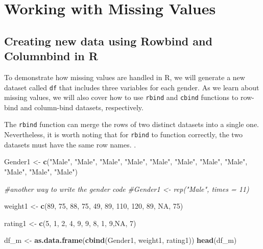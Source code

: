 \documentclass[
]{article}
\newenvironment{Shaded}{\begin{snugshade}}{\end{snugshade}}
\newcommand{\CommentTok}[1]{\textcolor[rgb]{0.56,0.35,0.01}{\textit{#1}}}
\newcommand{\ConstantTok}[1]{\textcolor[rgb]{0.56,0.35,0.01}{#1}}
\newcommand{\DecValTok}[1]{\textcolor[rgb]{0.00,0.00,0.81}{#1}}
\newcommand{\FunctionTok}[1]{\textcolor[rgb]{0.13,0.29,0.53}{\textbf{#1}}}
\newcommand{\NormalTok}[1]{#1}
\newcommand{\OtherTok}[1]{\textcolor[rgb]{0.56,0.35,0.01}{#1}}
\newcommand{\StringTok}[1]{\textcolor[rgb]{0.31,0.60,0.02}{#1}}
\begin{document}
\hypertarget{working-with-missing-values}{%
\section{Working with Missing
Values}\label{working-with-missing-values}}

\hypertarget{creating-new-data-using-rowbind-and-columnbind-in-r}{%
\subsection{Creating new data using Rowbind and Columnbind in
R}\label{creating-new-data-using-rowbind-and-columnbind-in-r}}

To demonstrate how missing values are handled in R, we will generate a
new dataset called \texttt{df} that includes three variables for each
gender. As we learn about missing values, we will also cover how to use
\texttt{rbind} and \texttt{cbind} functions to row-bind and column-bind
datasets, respectively.

The \texttt{rbind} function can merge the rows of two distinct datasets
into a single one. Nevertheless, it is worth noting that for
\texttt{rbind} to function correctly, the two datasets must have the
same row names. .

\begin{Shaded}
\begin{Highlighting}[]
\NormalTok{Gender1 }\OtherTok{\textless{}{-}} \FunctionTok{c}\NormalTok{(}\StringTok{"Male"}\NormalTok{, }\StringTok{"Male"}\NormalTok{, }\StringTok{"Male"}\NormalTok{, }\StringTok{"Male"}\NormalTok{, }\StringTok{"Male"}\NormalTok{, }
            \StringTok{"Male"}\NormalTok{, }\StringTok{"Male"}\NormalTok{, }\StringTok{"Male"}\NormalTok{, }\StringTok{"Male"}\NormalTok{, }\StringTok{"Male"}\NormalTok{, }\StringTok{"Male"}\NormalTok{)}

\CommentTok{\#another way to write the gender code}
\CommentTok{\#Gender1 \textless{}{-} rep("Male", times = 11)}

\NormalTok{weight1 }\OtherTok{\textless{}{-}} \FunctionTok{c}\NormalTok{(}\DecValTok{89}\NormalTok{, }\DecValTok{75}\NormalTok{, }\DecValTok{88}\NormalTok{, }\DecValTok{75}\NormalTok{, }\DecValTok{49}\NormalTok{, }\DecValTok{89}\NormalTok{, }\DecValTok{110}\NormalTok{, }\DecValTok{120}\NormalTok{, }\DecValTok{89}\NormalTok{, }\ConstantTok{NA}\NormalTok{, }\DecValTok{75}\NormalTok{)}

\NormalTok{rating1 }\OtherTok{\textless{}{-}} \FunctionTok{c}\NormalTok{(}\DecValTok{5}\NormalTok{, }\DecValTok{1}\NormalTok{, }\DecValTok{2}\NormalTok{, }\DecValTok{4}\NormalTok{, }\DecValTok{9}\NormalTok{, }\DecValTok{9}\NormalTok{, }\DecValTok{8}\NormalTok{, }\DecValTok{1}\NormalTok{, }\DecValTok{9}\NormalTok{,}\ConstantTok{NA}\NormalTok{, }\DecValTok{7}\NormalTok{) }

\NormalTok{df\_m }\OtherTok{\textless{}{-}} \FunctionTok{as.data.frame}\NormalTok{(}\FunctionTok{cbind}\NormalTok{(Gender1, weight1, rating1))}
\FunctionTok{head}\NormalTok{(df\_m)}
\end{Highlighting}
\end{Shaded}
\end{document}
